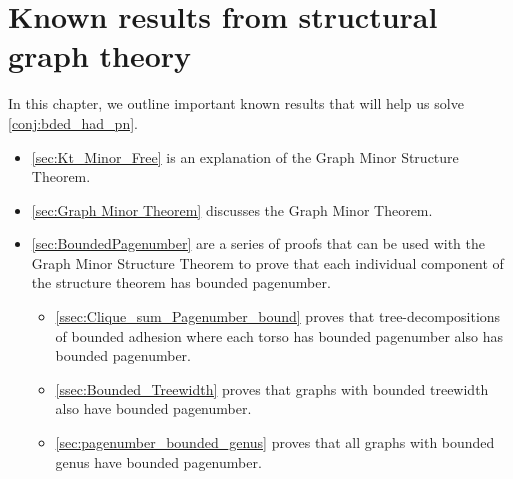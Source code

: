 
\chapter{Known results from structural graph theory}\label{chap:Known results}
In this chapter, we outline important known results that will help us solve \cref{conj:bded_had_pn}.

\begin{itemize}
	\item \cref{sec:Kt_Minor_Free} is an explanation of the Graph Minor Structure Theorem.
	\item \cref{sec:Graph Minor Theorem} discusses the Graph Minor Theorem. 
	\item \cref{sec:BoundedPagenumber} are a series of proofs that can be used with the Graph Minor Structure Theorem to prove that each individual component of the structure theorem has bounded pagenumber.
	\begin{itemize}
		\item \cref{ssec:Clique_sum_Pagenumber_bound} proves that tree-decompositions of bounded adhesion where each torso has bounded pagenumber also has bounded pagenumber.
		\item \cref{ssec:Bounded_Treewidth} proves that graphs with bounded treewidth also have bounded pagenumber.
		\item \cref{sec:pagenumber_bounded_genus} proves that all graphs with bounded genus have bounded pagenumber.
	\end{itemize}
\end{itemize}



